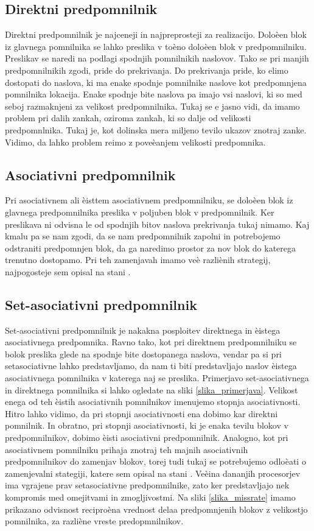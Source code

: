 \documentclass[12pt,a4paper,openany]{book}
\begin{document}
\subsection{Direktni predpomnilnik}
Direktni predpomnilnik je najceneji in najpreprosteji za realizacijo. Doloèen blok iz glavnega pomnilnika se lahko preslika v toèno doloèen
blok v predpomnilniku. Preslikav se naredi na podlagi spodnjih pomnilnikih naslovov. Tako se pri manjih predpomnilnikih zgodi, pride do prekrivanja.
Do prekrivanja pride, ko elimo dostopati do naslova, ki ma enake spodnje pomnilnike naslove kot predpomnjena pomnilnika lokacija. Enake spodnje bite naslova pa imajo vsi naslovi,
ki so med seboj razmaknjeni za velikost predpomnilnika. Tukaj se e jasno vidi, da imamo problem pri dalih zankah, oziroma zankah, ki so dalje od velikosti predpomnlnika.
Tukaj je, kot dolinska mera miljeno tevilo ukazov znotraj zanke. Vidimo, da lahko problem reimo z poveèanjem velikosti predpomnika.

\subsection{Asociativni predpomnilnik}
Pri asociativnem ali èisttem asociativnem predpomnilniku, se doloèen blok iz glavnega predpomnilnika preslika v poljuben blok v predpomnilnik. Ker preslikava ni odvisna le od spodnjih
bitov naslova prekrivanja tukaj nimamo. Kaj kmalu pa se nam zgodi, da se nam predpomnilnik zapolni in potrebojemo odstraniti predpomnjen blok, da ga naredimo prostor za nov blok do katerega
trenutno dostopamo. Pri teh zamenjavah imamo veè razliènih strategij, najpogosteje sem opisal na stani \pageref{strategija_menjave}. 

\subsection{Set-asociativni predpomnilnik}
Set-asociativni predpomnilnik je nakakna posploitev direktnega in èistega asociativnega predpomnika. Ravno tako, kot pri direktnem predpomnilniku se bolok preslika glede na spodnje bite
dostopanega naslova, vendar pa si pri setasociativne lahko predstavljamo, da nam ti biti predstavljajo naslov èistega asociativnega pomnilnika v katerega naj se preslika. Primerjavo set-asociativnega in direktnega pomnilnika si lahko ogledate na sliki \ref{slika_primerjava}. Velikost enega 
od teh èistih asociativnih pomnilnikov imenujemo stopnja asociativnosti. Hitro lahko vidimo, da pri stopnji asociativnosti ena dobimo kar direktni pomnilnik. In obratno, pri stopnji asociativnosti,
ki je enaka tevilu blokov v predpomnilnikov, dobimo èisti asociativni predpomnilnik. Analogno, kot pri asociativnem pomnilniku prihaja znotraj teh majnih asociativnih predpomnilnikov do
zamenjav blokov, torej tudi tukaj se potrebujemo odloèati o zamenjevalni stategiji, katere sem opisal na stani \pageref{strategija_menjave}. Veèina dananjih procesorjev ima vgrajene prav setasociativne
predpomnilnike, zato ker predstavljajo nek kompromis med omejitvami in zmogljivostmi. Na sliki \ref{slika_missrate} imamo prikazano
odvisnost reciproèna vrednost delaa predpomnjenih blokov z velikostjo pomnilnika, za razliène vreste predopmnilnikov.
\end{document}
